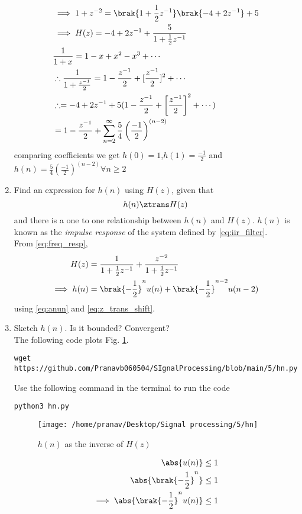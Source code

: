 \documentclass[journal,12pt,twocolumn]{IEEEtran}
\renewcommand\thesection{\arabic{section}}
\begin{document}
\begin{enumerate}[label=\thesection.\arabic*]
	\begin{align}
		&\implies 1 + z^{-2} = \brak{1 + \frac12 z^{-1}}\brak{-4 + 2z^{-1}} + 5 \\
		&\implies H(z) = -4 + 2z^{-1} + \frac{5}{1 + \frac12 z^{-1}}\\
		&\frac{1}{1+x}=1-x+x^2-x^3+\cdots\\
		&\therefore \frac{1}{1+\frac{z^{-1}}{2}}=1-\frac{z^{-1}}{2}+[\frac{z^{-1}}{2}]^{2}+\cdots\\
		&\therefore =-4+2z^{-1}+5(1-\frac{z^{-1}}{2}+\left[\frac{z^{-1}}{2}\right]^{2}+\cdots)\\
		&=1-\frac{z^{-1}}{2}+\sum_{n=2}^{\infty}\frac{5}{4} \left(\frac{-1}{2}\right)^{(n-2)}\\
		\end{align}
		comparing coefficients we get $h(0)=1$,$h(1)=\frac{-1}{2}$ and $h(n)=\frac{5}{4} \left(\frac{-1}{2}\right)^{(n-2)} \forall n \geq 2$\\
\item \label{prob:impulse_resp}
Find an expression for $h(n)$ using $H(z)$, given that 
\begin{equation}
\label{eq:impulse_resp}
h(n) \ztrans H(z)
\end{equation}
and there is a one to one relationship between $h(n)$ and $H(z)$. $h(n)$ is known as the {\em impulse response} of the
system defined by \eqref{eq:iir_filter}.
\\
\solution From \eqref{eq:freq_resp},
\begin{align}
H(z) &= \frac{1}{1 + \frac{1}{2}z^{-1}} + \frac{ z^{-2}}{1 + \frac{1}{2}z^{-1}}
\\
\implies h(n) &= \brak{-\frac{1}{2}}^{n}u(n) + \brak{-\frac{1}{2}}^{n-2}u(n-2)
\end{align}
using \eqref{eq:anun} and \eqref{eq:z_trans_shift}.
\item Sketch $h(n)$. Is it bounded? Convergent? 
\\
\solution The following code plots Fig. \ref{fig:hn}.
\begin{lstlisting}
wget https://github.com/Pranavb060504/SIgnalProcessing/blob/main/5/hn.py
\end{lstlisting}
Use the following command in the terminal to run the code
\begin{lstlisting}
python3 hn.py
\end{lstlisting}
\begin{figure}[!ht]
\centering
\texttt{[image: /home/pranav/Desktop/Signal processing/5/hn]}
\caption{$h(n)$ as the inverse of $H(z)$}
\label{fig:hn}
\end{figure}
\begin{align}
		\abs{u(n)} &\le 1 \\
		\abs{\brak{-\frac12}^n} &\le 1 \\
		\implies \abs{\brak{-\frac12}^n u(n)} &\le 1
	\end{align}
	

\end{enumerate}
\end{document}
